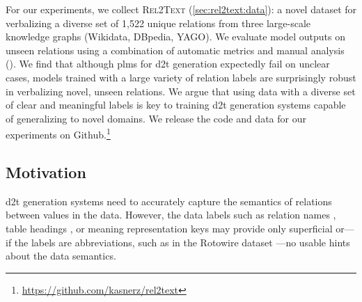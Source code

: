 For our experiments, we collect \textsc{Rel2Text} (\autoref{sec:rel2text:data}): a novel dataset for verbalizing a diverse set of 1,522 unique relations from three large-scale knowledge graphs (Wikidata, DBpedia, YAGO). We evaluate model outputs on unseen relations using a combination of automatic metrics and manual analysis (). We find that although \acp{plm} for \ac{d2t} generation expectedly fail on unclear cases, models trained with a large variety of relation labels are surprisingly robust in verbalizing novel, unseen relations. We argue that using data with a diverse set of clear and meaningful labels is key to training \ac{d2t} generation systems capable of generalizing to novel domains. We release the code and data for our experiments on Github.\footnote{\url{https://github.com/kasnerz/rel2text}}


% 

\subsection{Motivation}
\label{sec:rel2text:motivation}
\ac{d2t} generation systems need to accurately capture the semantics of relations between values in the data. However, the data labels such as relation names \cite{farber2018linked,haller2022analysis}, table headings \cite{parikhToTToControlledTableToText2020}, or meaning representation keys \cite{dusekEvaluatingStateoftheartEndtoEnd2020} may provide only superficial or---if the labels are abbreviations, such as in the Rotowire dataset \cite[cf. \autoref{sec:tok-eval}]{wiseman2017challenges}---no usable hints about the data semantics.



